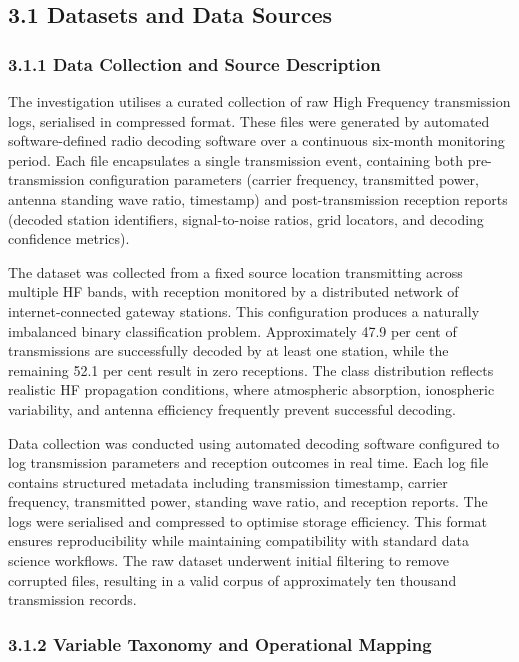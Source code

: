 \subsection{3.1 Datasets and Data
Sources}\label{datasets-and-data-sources}

\subsubsection{3.1.1 Data Collection and Source
Description}\label{data-collection-and-source-description}

The investigation utilises a curated collection of raw High Frequency
transmission logs, serialised in compressed format. These files were
generated by automated software-defined radio decoding software over a
continuous six-month monitoring period. Each file encapsulates a single
transmission event, containing both pre-transmission configuration
parameters (carrier frequency, transmitted power, antenna standing wave
ratio, timestamp) and post-transmission reception reports (decoded
station identifiers, signal-to-noise ratios, grid locators, and decoding
confidence metrics).

The dataset was collected from a fixed source location transmitting
across multiple HF bands, with reception monitored by a distributed
network of internet-connected gateway stations. This configuration
produces a naturally imbalanced binary classification problem.
Approximately 47.9 per cent of transmissions are successfully decoded by
at least one station, while the remaining 52.1 per cent result in zero
receptions. The class distribution reflects realistic HF propagation
conditions, where atmospheric absorption, ionospheric variability, and
antenna efficiency frequently prevent successful decoding.

Data collection was conducted using automated decoding software
configured to log transmission parameters and reception outcomes in real
time. Each log file contains structured metadata including transmission
timestamp, carrier frequency, transmitted power, standing wave ratio,
and reception reports. The logs were serialised and compressed to
optimise storage efficiency. This format ensures reproducibility while
maintaining compatibility with standard data science workflows. The raw
dataset underwent initial filtering to remove corrupted files, resulting
in a valid corpus of approximately ten thousand transmission records.

\subsubsection{3.1.2 Variable Taxonomy and Operational
Mapping}\label{variable-taxonomy-and-operational-mapping}

